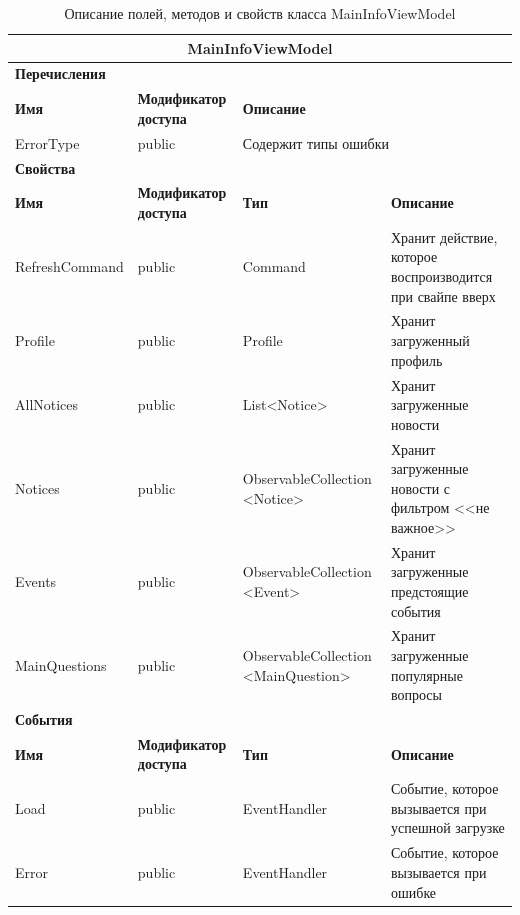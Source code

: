 \documentclass{../includes/TechDoc}
\begin{document}
    \begin{table}[ht]
        \caption{\label{tab:class-maininfoviewmodel-table}Описание полей, методов и свойств класса MainInfoViewModel}
        \centering
        \begin{tabular}{|p{3.2cm}|p{3cm}|p{2.9cm}|p{2.9cm}|p{4cm}|}
            \hline
            \multicolumn{5}{|c|}{MainInfoViewModel} \\ \hline
            \multicolumn{5}{|l|}{\textbf{Перечисления}} \\ \hline
            \textbf{Имя} & \textbf{Модификатор доступа} & \multicolumn{3}{p{5cm}|}{\textbf{Описание}} \\ \hline
            ErrorType & public & \multicolumn{3}{l|}{Содержит типы ошибки} \\ \hline
            \multicolumn{5}{|l|}{\textbf{Свойства}} \\ \hline
            \textbf{Имя} & \textbf{Модификатор доступа} & \textbf{Тип} & \multicolumn{2}{p{6.9cm}|}{\textbf{Описание}} \\ \hline
            RefreshCommand & public & Command & \multicolumn{2}{p{6.9cm}|}{Хранит действие, которое воспроизводится при свайпе вверх} \\ \hline
            Profile & public & Profile & \multicolumn{2}{p{6.9cm}|}{Хранит загруженный профиль} \\ \hline
            AllNotices & public & List<Notice> & \multicolumn{2}{p{6.9cm}|}{Хранит загруженные новости} \\ \hline
            Notices & public & ObservableCollection <Notice> & \multicolumn{2}{p{6.9cm}|}{Хранит загруженные новости с фильтром <<не важное>>} \\ \hline
            Events & public & ObservableCollection <Event> & \multicolumn{2}{p{6.9cm}|}{Хранит загруженные предстоящие события} \\ \hline
            MainQuestions & public & ObservableCollection <MainQuestion> & \multicolumn{2}{p{6.9cm}|}{Хранит загруженные популярные вопросы} \\ \hline
            \multicolumn{5}{|l|}{\textbf{События}} \\ \hline
            \textbf{Имя} & \textbf{Модификатор доступа} & \textbf{Тип} & \multicolumn{2}{p{6.9cm}|}{\textbf{Описание}} \\ \hline
            Load & public & EventHandler & \multicolumn{2}{p{6.9cm}|}{Событие, которое вызывается при успешной загрузке} \\ \hline
            Error & public & EventHandler & \multicolumn{2}{p{6.9cm}|}{Событие, которое вызывается при ошибке} \\ \hline

\end{tabular}
\end{table}
\end{document}
